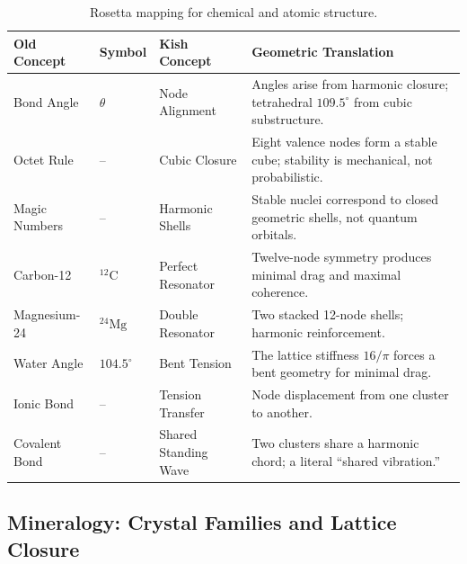 \documentclass[12pt,oneside]{book}
\begin{document}
\begin{table}[H]
\centering
\begin{tabular}{>{\raggedright}p{3cm} >{\centering}p{2cm} >{\raggedright}p{4cm} >{\raggedright\arraybackslash}p{5cm}}
\toprule
\textbf{Old Concept} & \textbf{Symbol} & \textbf{Kish Concept} & \textbf{Geometric Translation} \\
\midrule
Bond Angle & \(\theta\) & Node Alignment & 
Angles arise from harmonic closure; tetrahedral \(109.5^\circ\) from cubic substructure. \\
Octet Rule & -- & Cubic Closure & 
Eight valence nodes form a stable cube; stability is mechanical, not probabilistic. \\
Magic Numbers & -- & Harmonic Shells & 
Stable nuclei correspond to closed geometric shells, not quantum orbitals. \\
Carbon-12 & \(^{12}\mathrm{C}\) & Perfect Resonator & 
Twelve-node symmetry produces minimal drag and maximal coherence. \\
Magnesium-24 & \(^{24}\mathrm{Mg}\) & Double Resonator & 
Two stacked 12-node shells; harmonic reinforcement. \\
Water Angle & \(104.5^\circ\) & Bent Tension & 
The lattice stiffness \(16/\pi\) forces a bent geometry for minimal drag. \\
Ionic Bond & -- & Tension Transfer & 
Node displacement from one cluster to another. \\
Covalent Bond & -- & Shared Standing Wave & 
Two clusters share a harmonic chord; a literal “shared vibration.” \\
\bottomrule
\end{tabular}
\caption{Rosetta mapping for chemical and atomic structure.}
\end{table}

\subsection{Mineralogy: Crystal Families and Lattice Closure}
\end{document}
